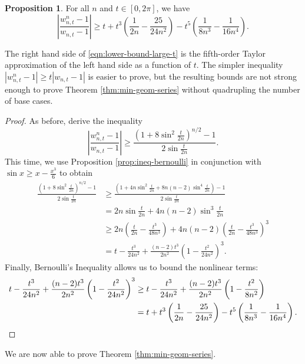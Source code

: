 \documentclass[11pt]{article}
\theoremstyle{definition}
\newtheorem{prop}{Proposition}
\newcommand{\abs}[1]{\left|#1\right|}
\begin{document}
\begin{prop}\label{prop:tighter-ineq}
	For all $n$ and $t\in[0,2\pi]$, we have
	\begin{equation}\label{eqn:lower-bound-large-t}
		\abs{\frac{w_{n,t}^n - 1}{w_{n,t} - 1}} \geq t + t^3\left(\frac{1}{2n} - \frac{25}{24n^2}\right) - t^5\left(\frac{1}{8n^3} - \frac{1}{16n^4}\right).
	\end{equation}
\end{prop}

The right hand side of \eqref{eqn:lower-bound-large-t} is the fifth-order Taylor approximation of the left hand side as a function of $t$.  The simpler inequality $|w_{n,t}^n - 1| \geq t|w_{n,t} - 1|$ is easier to prove, but the resulting bounds are not strong enough to prove Theorem \ref{thm:min-geom-series} without quadrupling the number of base cases.

\begin{proof}
	As before, derive the inequality
	\[
	\abs{\frac{w_{n,t}^n - 1}{w_{n,t} - 1}} \geq
	\frac{(1 + 8\sin^2\frac t{2n})^{n/2} - 1}{2\sin\frac t{2n}}.
	\]
	This time, we use Proposition \ref{prop:ineq-bernoulli} in conjunction with $\sin x \geq x - \tfrac{x^3}6$ to obtain
	\begin{align*}
		\frac{(1 + 8\sin^2\frac t{2n})^{n/2} - 1}{2\sin\frac t{2n}} &\geq \frac{(1 + 4n\sin^2\frac{t}{2n} + 8n(n-2)\sin^4\frac{t}{2n}) - 1}{2\sin\frac{t}{2n}}\\
		&= 2n\sin\frac{t}{2n} + 4n(n-2)\sin^3\frac{t}{2n}\\
		&\geq 2n\left(\frac{t}{2n} - \frac{t^3}{48n^3}\right) + 4n(n-2)\left(\frac{t}{2n} - \frac{t^3}{48n^3}\right)^3\\
		&=t - \frac{t^3}{24n^2} + \frac{(n-2)t^3}{2n^2}\left(1 - \frac{t^2}{24n^2}\right)^3.
	\end{align*}
	Finally, Bernoulli's Inequality allows us to bound the nonlinear terms:
	\begin{align*}
		t - \frac{t^3}{24n^2} + \frac{(n-2)t^3}{2n^2}\left(1 - \frac{t^2}{24n^2}\right)^3
		&\geq t - \frac{t^3}{24n^2} + \frac{(n-2)t^3}{2n^2}\left(1 - \frac{t^2}{8n^2}\right)\\
		&= t + t^3\left(\frac{1}{2n} - \frac{25}{24n^2}\right) - t^5\left(\frac{1}{8n^3} - \frac{1}{16n^4}\right).\qedhere
	\end{align*}
\end{proof}

We are now able to prove Theorem \ref{thm:min-geom-series}.
\end{document}
